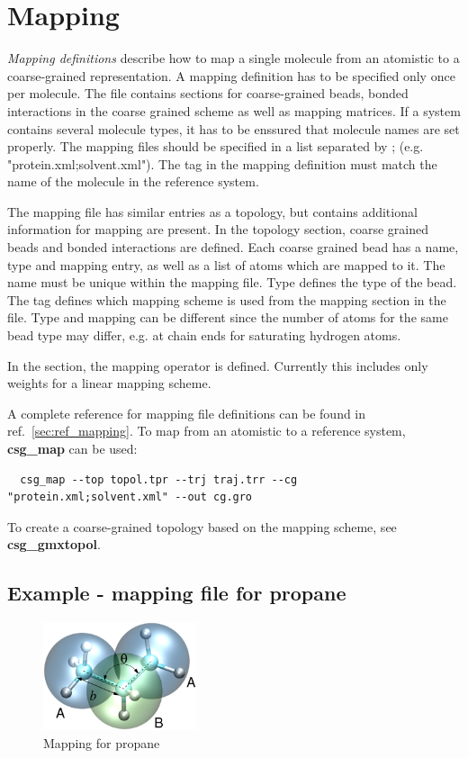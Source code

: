 \section{Mapping}
\label{sec:mapping}
{\em Mapping definitions} describe how to map a single molecule from an atomistic to a coarse-grained representation. A mapping definition has to be specified only once per molecule. The file contains sections for coarse-grained beads, bonded interactions in the coarse grained scheme as well as mapping matrices. If a system contains several molecule types, it has to be enssured that molecule names are set properly. The mapping files should be specified in a list separated by ; (e.g. "protein.xml;solvent.xml"). The  tag in the mapping definition must match the name of the molecule in the reference system.

The mapping file has similar entries as a topology, but contains additional information for mapping are present. In the topology section, coarse grained beads and bonded interactions are defined. Each coarse grained bead has a name, type and mapping entry, as well as a list of atoms which are mapped to it. The name must be unique within the mapping file. Type defines the type of the bead. The  tag defines which mapping scheme is used from the mapping section in the file. Type and mapping can be different since the number of atoms for the same bead type may differ, e.g. at chain ends for saturating hydrogen atoms.

In the  section, the mapping operator is defined. Currently this includes only weights for a linear mapping scheme.

A complete reference for mapping file definitions can be found in ref.~\ref{sec:ref_mapping}. To map from an atomistic to a reference system, \textbf{csg\_map} can be used:
\begin{verbatim}
  csg_map --top topol.tpr --trj traj.trr --cg "protein.xml;solvent.xml" --out cg.gro
\end{verbatim}

To create a coarse-grained topology based on the mapping scheme, see \textbf{csg\_gmxtopol}.

\subsection{Example - mapping file for propane}
\begin{figure}[ht]
  \includegraphics[width=0.4\textwidth]{functionality/fig/propane.eps}
  \caption{Mapping for propane}
\end{figure}


